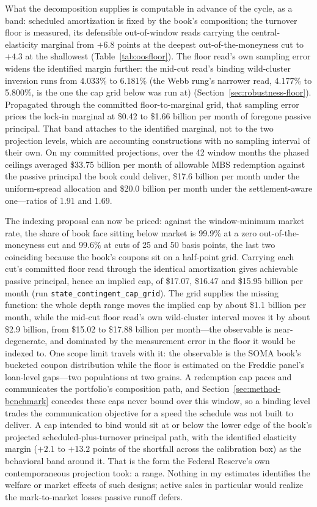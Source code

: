 What the decomposition supplies is computable in advance of the cycle, as a band: scheduled amortization is fixed by the book's composition; the turnover floor is measured, its defensible out-of-window reads carrying the central-elasticity marginal from $+6.8$ points at the deepest out-of-the-moneyness cut to $+4.3$ at the shallowest (Table~\ref{tab:oosfloor}). The floor read's own sampling error widens the identified margin further: the mid-cut read's binding wild-cluster inversion runs from 4.033\% to 6.181\% (the Webb rung's narrower read, 4.177\% to 5.800\%, is the one the cap grid below was run at) (Section~\ref{sec:robustness-floor}). Propagated through the committed floor-to-marginal grid, that sampling error prices the lock-in marginal at \$0.42 to \$1.66 billion per month of foregone passive principal. That band attaches to the identified marginal, not to the two projection levels, which are accounting constructions with no sampling interval of their own. On my committed projections, over the 42 window months the phased ceilings averaged \$33.75 billion per month of allowable MBS redemption against the passive principal the book could deliver, \$17.6 billion per month under the uniform-spread allocation and \$20.0 billion per month under the settlement-aware one---ratios of 1.91 and 1.69.

The indexing proposal can now be priced: against the window-minimum market rate, the share of book face sitting below market is 99.9\% at a zero out-of-the-moneyness cut and 99.6\% at cuts of 25 and 50 basis points, the last two coinciding because the book's coupons sit on a half-point grid. Carrying each cut's committed floor read through the identical amortization gives achievable passive principal, hence an implied cap, of \$17.07, \$16.47 and \$15.95 billion per month (run \texttt{state\_contingent\_cap\_grid}). The grid supplies the missing function: the whole depth range moves the implied cap by about \$1.1 billion per month, while the mid-cut floor read's own wild-cluster interval moves it by about \$2.9 billion, from \$15.02 to \$17.88 billion per month---the observable is near-degenerate, and dominated by the measurement error in the floor it would be indexed to. One scope limit travels with it: the observable is the SOMA book's bucketed coupon distribution while the floor is estimated on the Freddie panel's loan-level gaps---two populations at two grains. A redemption cap paces and communicates the portfolio's composition path, and Section~\ref{sec:method-benchmark} concedes these caps never bound over this window, so a binding level trades the communication objective for a speed the schedule was not built to deliver. A cap intended to bind would sit at or below the lower edge of the book's projected scheduled-plus-turnover principal path, with the identified elasticity margin ($+2.1$ to $+13.2$ points of the shortfall across the calibration box) as the behavioral band around it. That is the form the Federal Reserve's own contemporaneous projection took: a range. Nothing in my estimates identifies the welfare or market effects of such designs; active sales in particular would realize the mark-to-market losses passive runoff defers.

